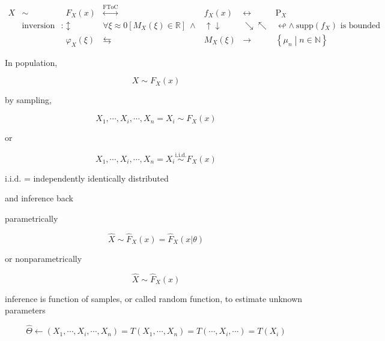 \documentclass[
]{book}
\theoremstyle{definition}
\theoremstyle{definition}
\theoremstyle{definition}
\theoremstyle{definition}
\theoremstyle{remark}
\begin{document}
\[
\begin{array}{ccccccc}
X & \sim & F_{{\scriptscriptstyle X}}\left(x\right) & \overset{\text{FToC}}{\longleftrightarrow} & f_{{\scriptscriptstyle X}}\left(x\right) & \leftrightarrow & \mathrm{P}_{{\scriptscriptstyle X}}\\
 & \text{inversion formula}\ : & \updownarrow & \forall\xi\approx0\left[M_{{\scriptscriptstyle X}}\left(\xi\right)\in\mathbb{R}\right]\ \wedge & \uparrow\downarrow & \searrow\nwarrow & \looparrowleft\wedge\ \mathrm{supp}\left(f_{{\scriptscriptstyle X}}\right)\text{ is bounded}\\
 &  & \varphi_{{\scriptscriptstyle X}}\left(\xi\right) & \leftrightarrows & M_{{\scriptscriptstyle X}}\left(\xi\right) & \rightarrow & \left\{ \mu_{{\scriptscriptstyle n}}\middle|n\in\mathbb{N}\right\} 
\end{array}
\]

In population,

\[
X\sim F_{{\scriptscriptstyle X}}\left(x\right)
\]

by sampling,

\[
X_{{\scriptscriptstyle 1}},\cdots,X_{{\scriptscriptstyle i}},\cdots,X_{{\scriptscriptstyle n}}=X_{{\scriptscriptstyle i}}\sim F_{{\scriptscriptstyle X}}\left(x\right)
\]

or

\[
X_{{\scriptscriptstyle 1}},\cdots,X_{{\scriptscriptstyle i}},\cdots,X_{{\scriptscriptstyle n}}=X_{{\scriptscriptstyle i}}\overset{\text{i.i.d.}}{\sim}F_{{\scriptscriptstyle X}}\left(x\right)
\]

\(\text{i.i.d.}\) = independently identically distributed

and inference back

parametrically

\[
\widehat{X}\sim\widehat{F}_{{\scriptscriptstyle X}}\left(x\right)=\widehat{F}_{{\scriptscriptstyle X}}\left(x|\theta\right)
\]

or nonparametrically

\[
\hat{X}\sim\hat{F}_{{\scriptscriptstyle X}}\left(x\right)
\]

inference is function of samples, or called random function, to estimate unknown parameters

\[
\widehat{\Theta}\leftarrow\left(X_{{\scriptscriptstyle 1}},\cdots,X_{{\scriptscriptstyle i}},\cdots,X_{{\scriptscriptstyle n}}\right)=T\left(X_{{\scriptscriptstyle 1}},\cdots,X_{{\scriptscriptstyle n}}\right)=T\left(\cdots,X_{{\scriptscriptstyle i}},\cdots\right)=T\left(X_{{\scriptscriptstyle i}}\right)
\]
\end{document}
